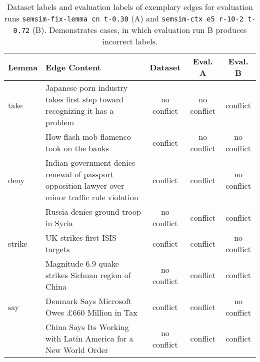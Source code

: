 \documentclass[11pt, numbers=noenddot]{scrreprt}
\begin{document}
\begin{table}[htp]
\centering
\begin{tabular}{l p{6cm} ccc}
\toprule
Lemma & Edge Content & Dataset & Eval. A & Eval. B \\
\midrule
take & Japanese porn industry takes first step toward recognizing it has a problem & no conflict & no conflict & conflict \\
\cline{2-5}
	 & How flash mob flamenco took on the banks & conflict & no conflict & no conflict \\
\hline
deny		& Indian government denies renewal of passport opposition lawyer over minor traffic rule violation & conflict & conflict & no conflict \\
\cline{2-5}
			& Russia denies ground troop in Syria & no conflict & conflict & conflict \\
\hline
strike 		& UK strikes first ISIS targets & conflict & conflict & no conflict \\
\cline{2-5}
			& Magnitude 6.9 quake strikes Sichuan region of China & no conflict & conflict & conflict \\
\hline
say 	& Denmark Says Microsoft Owes  £660 Million in Tax & conflict & conflict & no conflict \\
\cline{2-5}
		& China Says Its Working with Latin America for a New World Order & no conflict & conflict & conflict \\
\bottomrule
\end{tabular}
\caption{Dataset labels and evaluation labels of exemplary edges for evaluation runs \texttt{semsim-fix-lemma cn t-0.30} (A) and \texttt{semsim-ctx e5 r-10-2 t-0.72} (B). Demonstrates cases, in which evaluation run B produces incorrect labels.}
\label{tab:example-edge-labels-eval-a-win}
\end{table}
\end{document}

